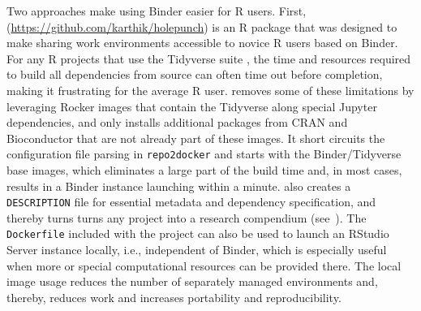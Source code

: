 Two approaches make using Binder easier for R users. First,
\textbf{} (\url{https://github.com/karthik/holepunch}) is
an R package that was designed to make sharing work environments
accessible to novice R users based on Binder. For any R projects that
use the Tidyverse suite \citep{wickham_welcome_2019}, the time and
resources required to build all dependencies from source can often time
out before completion, making it frustrating for the average R user.
 removes some of these limitations by leveraging Rocker
images that contain the Tidyverse along special Jupyter dependencies,
and only installs additional packages from CRAN and Bioconductor that
are not already part of these images. It short circuits the
configuration file parsing in \texttt{repo2docker} and starts with the
Binder/Tidyverse base images, which eliminates a large part of the build
time and, in most cases, results in a Binder instance launching within a
minute.  also creates a \texttt{DESCRIPTION} file for
essential metadata and dependency specification, and thereby turns turns
any project into a research compendium (see~). The
\texttt{Dockerfile} included with the project can also be used to launch
an RStudio Server instance locally, i.e., independent of Binder, which
is especially useful when more or special computational resources can be
provided there. The local image usage reduces the number of separately
managed environments and, thereby, reduces work and increases
portability and reproducibility.

